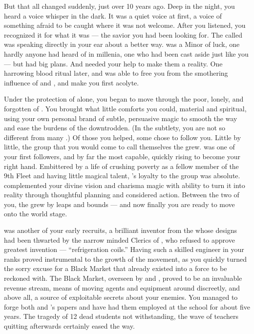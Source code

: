 \documentclass[char]{GL2020}
\begin{document}
But that all changed suddenly, just over 10 years ago. Deep in the night, you heard a voice whisper in the dark. It was a quiet voice at first, a voice of something afraid to be caught where it was not welcome. After you listened, you recognized it for what it was — the savior you had been looking for. The \cGenesis{\Deity} called \cGenesis{} was speaking directly in your ear about a better way. \cGenesis{} was a Minor \cGenesis{\Deity} of luck, one hardly anyone had heard of in millenia, one who had been cast aside just like you — but \cGenesis{} had big plans. And \cGenesis{\they} needed your help to make them a reality. One harrowing blood ritual later, and \cGenesis{} was able to free you from the smothering influence of \cEbb{} and \cFlow{}, and make you \cGenesis{\their} first acolyte.

Under the protection of \cGenesis{} alone, you began to move through the poor, lonely, and forgotten of \pEarth{}. You brought what little comforts you could, material and spiritual, using your own personal brand of subtle, persuasive magic to smooth the way and ease the burdens of the downtrodden. (In the subtlety, you are not so different from many \pShippies{}.) Of those you helped, some chose to follow you. Little by little, the group that you would come to call themselves the \pGoaties{} grew. \cChupSecond{\full} was one of your first followers, and by far the most capable, quickly rising to become your right hand. Embittered by a life of crushing poverty as a fellow member of the 9th Fleet and having little magical talent, \cChupSecond{}'s loyalty to the group was absolute. \cChupSecond{\They} complemented your divine vision and charisma magic with \cChupSecond{\their} ability to turn it into reality through thoughtful planning and considered action. Between the two of you, the \pGoaties{} grew by leaps and bounds — and now finally you are ready to move onto the world stage.

\cChupInventor{\full} was another of your early recruits, a brilliant inventor from the \pTech{} whose designs had been thwarted by the narrow minded Clerics of \cTechGod{}, who refused to approve \cChupInventor{\their} greatest invention — ``refrigeration coils.'' Having such a skilled engineer in your ranks proved instrumental to the growth of the movement, as you quickly turned the sorry excuse for a Black Market that already existed into a force to be reckoned with. The Black Market, overseen by \cChupSecond{} and \cChupInventor{}, proved to be an invaluable revenue stream, means of moving agents and equipment around discreetly, and above all, a source of exploitable secrets about your enemies. You managed to forge both \cChupSecond{} and \cChupInventor{}’s papers and have had them employed at the school for about five years. The tragedy of 12 dead students not withstanding, the wave of teachers quitting afterwards certainly eased the way.
\end{document}
